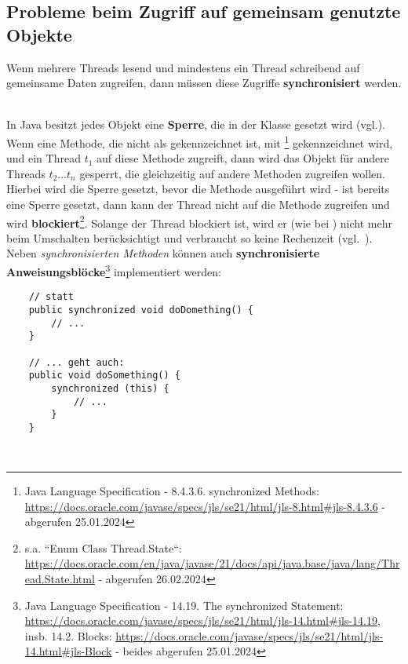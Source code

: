 \subsection{Probleme beim Zugriff auf gemeinsam genutzte Objekte}\label{subsec:synchronizedstatement}

\begin{tcolorbox}
   Wenn mehrere Threads lesend und mindestens ein Thread schreibend auf gemeinsame Daten zugreifen, dann müssen diese Zugriffe \textbf{synchronisiert} werden.
\end{tcolorbox}\\

In Java besitzt jedes Objekt eine \textbf{Sperre}, die in der Klasse  gesetzt wird (vgl.\cite[26]{Oec22}).\\

\noindent
Wenn eine Methode, die nicht als  gekennzeichnet ist, mit \footnote{
    Java Language Specification - 8.4.3.6. synchronized Methods: \url{https://docs.oracle.com/javase/specs/jls/se21/html/jls-8.html#jls-8.4.3.6} - abgerufen 25.01.2024
} gekennzeichnet wird, und ein Thread $t_1$ auf diese  Methode zugreift, dann wird das Objekt für andere Threads $t_2\dots t_n$ gesperrt, die gleichzeitig auf andere  Methoden zugreifen wollen.\\
Hierbei wird die Sperre gesetzt, bevor die Methode ausgeführt wird - ist bereits eine Sperre gesetzt, dann kann der Thread nicht auf die Methode zugreifen und wird \textbf{blockiert}\footnote{
    s.a. ``Enum Class Thread.State``: \url{https://docs.oracle.com/en/java/javase/21/docs/api/java.base/java/lang/Thread.State.html} - abgerufen 26.02.2024
}.
Solange der Thread blockiert ist, wird er (wie bei ) nicht mehr beim Umschalten berücksichtigt und verbraucht so keine Rechenzeit (vgl.~\cite[26]{Oec22}).
\\

\noindent
Neben \textit{synchronisierten Methoden} können auch \textbf{synchronisierte Anweisungsblöcke}\footnote{
Java Language Specification - 14.19. The synchronized Statement: \url{https://docs.oracle.com/javase/specs/jls/se21/html/jls-14.html#jls-14.19}, insb. 14.2. Blocks: \url{https://docs.oracle.com/javase/specs/jls/se21/html/jls-14.html#jls-Block} - beides abgerufen 25.01.2024
} implementiert werden:\\

\begin{verbatim}
    // statt
    public synchronized void doDomething() {
        // ...
    }

    // ... geht auch:
    public void doSomething() {
        synchronized (this) {
            // ...
        }
    }
\end{verbatim}\\


